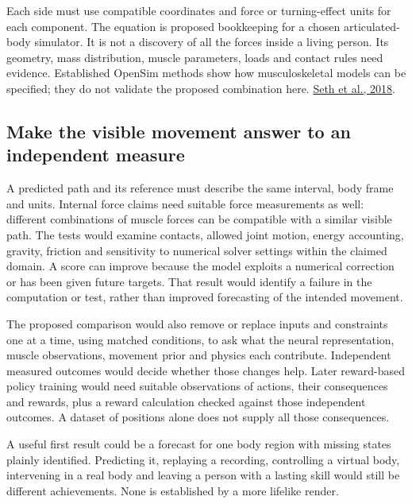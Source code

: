 Each side must use compatible coordinates and force or turning-effect units for each component. The equation is proposed bookkeeping for a chosen articulated-body simulator. It is not a discovery of all the forces inside a living person. Its geometry, mass distribution, muscle parameters, loads and contact rules need evidence. Established OpenSim methods show how musculoskeletal models can be specified; they do not validate the proposed combination here. \href{https://journals.plos.org/ploscompbiol/article?id=10.1371/journal.pcbi.1006223}{Seth et al., 2018}.

\subsection{Make the visible movement answer to an independent measure}

A predicted path and its reference must describe the same interval, body frame and units. Internal force claims need suitable force measurements as well: different combinations of muscle forces can be compatible with a similar visible path. The tests would examine contacts, allowed joint motion, energy accounting, gravity, friction and sensitivity to numerical solver settings within the claimed domain. A score can improve because the model exploits a numerical correction or has been given future targets. That result would identify a failure in the computation or test, rather than improved forecasting of the intended movement.

The proposed comparison would also remove or replace inputs and constraints one at a time, using matched conditions, to ask what the neural representation, muscle observations, movement prior and physics each contribute. Independent measured outcomes would decide whether those changes help. Later reward-based policy training would need suitable observations of actions, their consequences and rewards, plus a reward calculation checked against those independent outcomes. A dataset of positions alone does not supply all those consequences.

A useful first result could be a forecast for one body region with missing states plainly identified. Predicting it, replaying a recording, controlling a virtual body, intervening in a real body and leaving a person with a lasting skill would still be different achievements. None is established by a more lifelike render.

